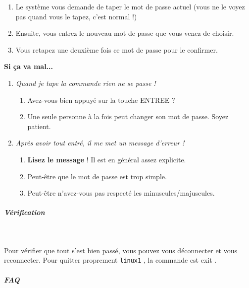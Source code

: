 \documentclass[11pt,a4paper]{article}
\begin{document}
					\begin{enumerate}
				
			\item Le syst\`eme vous demande de taper le mot de passe actuel (vous ne le voyez pas quand vous le tapez, c'est normal !)
			\item Ensuite, vous entrez le nouveau mot de passe que vous venez de choisir.
			\item Vous retapez une deuxi\`eme fois ce mot de passe pour le confirmer.
					\end{enumerate}
				 \textbf{Si \c ca va mal...} 
					\begin{enumerate}
				
			\item  \textit{Quand je tape la commande rien ne se passe !} 
					\begin{enumerate}
				
			\item Avez-vous bien appuy\'e sur la touche ENTREE  ?
			\item Une seule personne \`a la fois peut changer son mot de passe. Soyez patient.
					\end{enumerate}
				
			\item  \textit{Apr\`es avoir tout entr\'e, il me met un message d'erreur !} 
					\begin{enumerate}
				
			\item  \textbf{Lisez le message}  ! Il est en g\'en\'eral assez explicite.
			\item Peut-\^etre que le mot de passe est trop simple.
			\item Peut-\^etre n'avez-vous pas respect\'e les minuscules/majuscules.
					\end{enumerate}
				
					\end{enumerate}
				
			
		\subparagraph{V\'erification} 
		
					\textcolor{white}{.} \par
				
            \par
        
Pour v\'erifier que tout s'est bien pass\'e, vous pouvez vous d\'econnecter et vous reconnecter. Pour quitter proprement  \texttt{linux1} , la commande est exit .

			
		\subparagraph{FAQ} 
		
\end{document}
